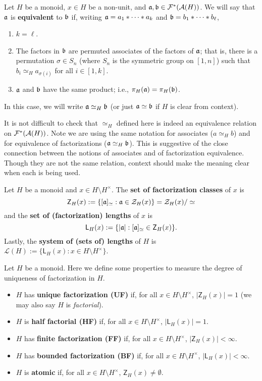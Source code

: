 \begin{defn} \label{def:equivalence}
Let $H$ be a monoid, $x\in H$ be a non-unit, and $\aa,\bb \in \F^*(\A(H))$.
We will say that $\aa$ is \textbf{equivalent} to $\bb$ if, writing $\aa = a_1*\cdots * a_k$ and $\bb = b_1*\cdots * b_\ell$,
\begin{enumerate}
\item $k = \ell$.
\item The factors in $\bb$ are permuted associates of the factors of $\aa$; that is, there is a permutation $\sigma\in S_n$ (where $S_n$ is the symmetric group on $[1,n]$) such that $b_i \simeq_H a_{\sigma(i)}$ for all $i\in [1,k]$.
\item $\aa$ and $\bb$ have the same product; i.e., $\pi_H(\aa) = \pi_H(\bb)$.
\end{enumerate}
In this case, we will write $\aa \simeq_H \bb$ (or just $\aa\simeq\bb$ if $H$ is clear from context).
\end{defn}

It is not difficult to check that $\simeq_H$ defined here is indeed an equivalence relation on $\F^*(\A(H))$.
Note we are using the same notation for associates ($a\simeq_H b$) and for equivalence of factorizations ($\aa\simeq_H\bb$).
This is suggestive of the close connection between the notions of associates and of factorization equivalence.
Though they are not the same relation, context should make the meaning clear when each is being used.  

\begin{defn} \label{def:set of lengths}
Let $H$ be a monoid and $x\in H\setminus H^\times$.
The \textbf{set of factorization classes} of $x$ is
\[ \mathsf{Z}_H(x) := \{ [\aa]_{\simeq}: \aa\in \Z_H(x) \} = \Z_H(x)/\simeq \]
and the \textbf{set of (factorization) lengths} of $x$ is
\[ \mathsf{L}_H(x) := \{ |\aa| : [\aa]_{\simeq} \in \mathsf{Z}_H(x) \}. \]
Lastly, the \textbf{system of (sets of) lengths} of $H$ is $\mathcal{L}(H) := \{\mathsf{L}_H(x): x\in H\setminus H^\times\}$.
\end{defn}

\begin{defn} \label{def:factorization properties}
Let $H$ be a monoid.
Here we define some properties to measure the degree of uniqueness of factorization in $H$.
\begin{itemize}
\item $H$ has \textbf{unique factorization (UF)} if, for all $x\in H\setminus H^\times$, $|\mathsf{Z}_H(x)| = 1$ (we may also say $H$ is \textit{factorial}).
\item $H$ is \textbf{half factorial (HF)} if, for all $x\in H\setminus H^\times$, $|\mathsf{L}_H(x)| = 1$.
\item $H$ has \textbf{finite factorization (FF)} if, for all $x\in H\setminus H^\times$, $|\mathsf{Z}_H(x)| <\infty$.
\item $H$ has \textbf{bounded factorization (BF)} if, for all $x\in H\setminus H^\times$, $|\mathsf{L}_H(x)| < \infty$.
\item $H$ is \textbf{atomic} if, for all $x\in H\setminus H^\times$, $\mathsf{Z}_H(x) \neq \emptyset$.
\end{itemize}
\end{defn}

